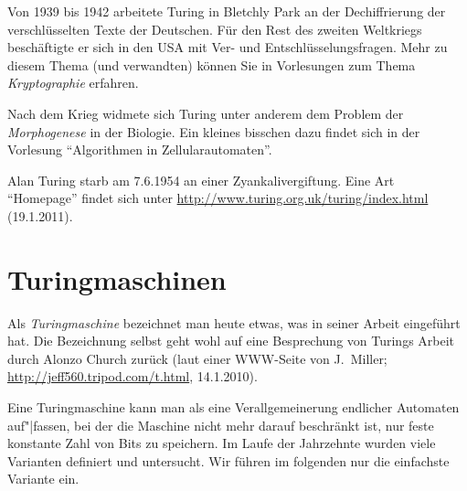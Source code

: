 Von 1939 bis 1942 arbeitete Turing in Bletchly Park an der
Dechiffrierung der verschlüsselten Texte der Deutschen. 
%
Für den Rest des zweiten Weltkriegs beschäftigte er sich in den USA
mit Ver- und Entschlüsselungsfragen. 
%
Mehr zu diesem Thema (und verwandten) können Sie in Vorlesungen zum
Thema \emph{Kryptographie} erfahren.

Nach dem Krieg widmete sich Turing unter anderem dem Problem der
\emph{Morphogenese} in der Biologie. 
%
Ein kleines bisschen dazu findet sich in der Vorlesung "`Algorithmen
in Zellularautomaten"'.

Alan Turing starb am 7.6.1954 an einer Zyankalivergiftung.
%
Eine Art "`Homepage"' findet sich unter
\url{http://www.turing.org.uk/turing/index.html} (19.1.2011).

\Tut\section{Turingmaschinen}
\label{sec:turingmaschinen}

Als \emph{Turingmaschine} bezeichnet man heute etwas, was
\textcite{Turing_1936_CNW_ar} in seiner Arbeit eingeführt hat. 
%
Die Bezeichnung selbst geht wohl auf eine Besprechung von Turings
Arbeit durch Alonzo Church zurück (laut einer WWW-Seite von J.~Miller;
\url{http://jeff560.tripod.com/t.html}, 14.1.2010).

Eine Turingmaschine kann man als eine Verallgemeinerung endlicher
Automaten auf"|fassen, bei der die Maschine nicht mehr darauf
beschränkt ist, nur feste konstante Zahl von Bits zu speichern. 
%
Im Laufe der Jahrzehnte wurden viele Varianten definiert und
untersucht. Wir führen im folgenden nur die einfachste Variante ein.

